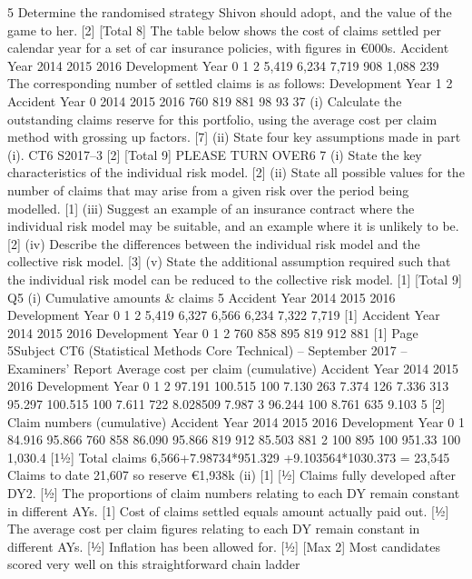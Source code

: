 \documentclass[a4paper,12pt]{article}
\begin{document}
\begin{enumerate}
5
Determine the randomised strategy Shivon should adopt, and the value of the
game to her.
[2]
[Total 8]
The table below shows the cost of claims settled per calendar year for a set of car
insurance policies, with figures in €000s.
Accident Year
2014
2015
2016
Development Year
0
1
2
5,419
6,234
7,719
908
1,088
239
The corresponding number of settled claims is as follows:
Development Year
1
2
Accident Year 0
2014
2015
2016 760
819
881
98
93
37
(i) Calculate the outstanding claims reserve for this portfolio, using the average
cost per claim method with grossing up factors.
[7]
(ii) State four key assumptions made in part (i).
CT6 S2017–3
[2]
[Total 9]
PLEASE TURN OVER6
7
(i) State the key characteristics of the individual risk model.
[2]
(ii) State all possible values for the number of claims that may arise from a given
risk over the period being modelled.
[1]
(iii) Suggest an example of an insurance contract where the individual risk model
may be suitable, and an example where it is unlikely to be.
[2]
(iv) Describe the differences between the individual risk model and the collective
risk model.
[3]
(v) State the additional assumption required such that the individual risk model
can be reduced to the collective risk model.
[1]
[Total 9]
Q5
(i)
Cumulative amounts & claims
5
Accident Year
2014
2015
2016
Development Year
0
1
2
5,419 6,327 6,566
6,234 7,322
7,719
[1]
Accident Year
2014
2015
2016
Development Year
0
1
2
760
858
895
819
912
881
[1]
Page 5Subject CT6 (Statistical Methods Core Technical) – September 2017 – Examiners’ Report
Average cost per claim (cumulative)
Accident Year
2014
2015
2016
Development Year
0
1
2
97.191%
100.515%
100%
7.130 263
7.374 126
7.336 313
95.297%
100.515%
100%
7.611 722
8.028509
7.987 3
96.244%
100%
8.761 635
9.103 5
[2]
Claim numbers (cumulative)
Accident Year
2014
2015
2016
Development Year
0
1
84.916%
95.866%
760
858
86.090%
95.866%
819
912
85.503%
881
2
100%
895
100%
951.33
100%
1,030.4
[11⁄2]
Total claims 6,566+7.98734*951.329 +9.103564*1030.373 = 23,545
Claims to date 21,607 so reserve €1,938k
(ii)
[1]
[1⁄2]
Claims fully developed after DY2.
[1⁄2]
The proportions of claim numbers relating to each DY remain constant in
different AYs.
[1]
Cost of claims settled equals amount actually paid out.
[1⁄2]
The average cost per claim figures relating to each DY remain constant in
different AYs.
[1⁄2]
Inflation has been allowed for.
[1⁄2]
[Max 2]
Most candidates scored very well on this straightforward chain ladder

\end{enumerate}
\end{document}
